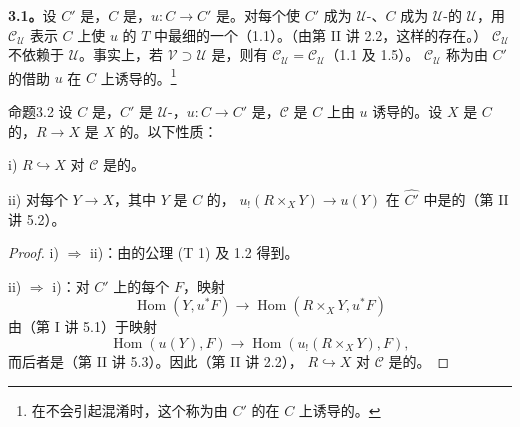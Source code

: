 \textbf{3.1。}设 $C'$ 是，$C$ 是，$u:C\to C'$ 是。对每个使 $C'$ 成为 $\mathcal U$-、$C$ 成为 $\mathcal U$-的 $\mathcal U$，用 $\mathscr C_{\mathcal U}$ 表示 $C$ 上使 $u$ 的 $T$ 中最细的一个（1.1）。（由第 II 讲 2.2，这样的存在。） $\mathscr C_{\mathcal U}$ 不依赖于 $\mathcal U$。事实上，若 $\mathcal V\supset\mathcal U$ 是，则有 $\mathscr C_{\mathcal U}=\mathscr C_{\mathcal U}$（1.1 及 1.5）。 $\mathscr C_{\mathcal U}$ 称为由 $C'$ 的借助 $u$ 在 $C$ 上诱导的。\footnote{在不会引起混淆时，这个称为由 $C'$ 的在 $C$ 上诱导的。}

\begin{SGAresult}{命题}{3.2}
设 $C$ 是，$C'$ 是 $\mathcal U$-，$u:C\to C'$ 是，$\mathscr C$ 是 $C$ 上由 $u$ 诱导的。设 $X$ 是 $C$ 的，$R\to X$ 是 $X$ 的。以下性质：

\noindent i)  $R\hookrightarrow X$ 对 $\mathscr C$ 是的。

\noindent ii) 对每个 $Y\to X$，其中 $Y$ 是 $C$ 的， $u_!(R\times_XY)\to u(Y)$ 在 $\widehat {C'}$ 中是的（第 II 讲 5.2）。
\end{SGAresult}
\begin{proof}
\noindent i) $\Rightarrow$ ii)：由的公理 (T 1) 及 1.2 得到。

\noindent ii) $\Rightarrow$ i)：对 $C'$ 上的每个 $F$，映射
\[
 \operatorname{Hom}(Y,u^*F)\longrightarrow\operatorname{Hom}(R\times_XY,u^*F)
\]
由（第 I 讲 5.1）于映射
\[
 \operatorname{Hom}(u(Y),F)\longrightarrow\operatorname{Hom}(u_!(R\times_XY),F),
\]
而后者是（第 II 讲 5.3）。因此（第 II 讲 2.2）， $R\hookrightarrow X$ 对 $\mathscr C$ 是的。
\end{proof}

